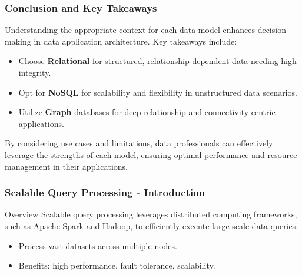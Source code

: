 \documentclass[aspectratio=169]{beamer}
\begin{document}
\begin{frame}[fragile]
    \frametitle{Conclusion and Key Takeaways}
    Understanding the appropriate context for each data model enhances decision-making in data application architecture. Key takeaways include:
    \begin{itemize}
        \item Choose \textbf{Relational} for structured, relationship-dependent data needing high integrity.
        \item Opt for \textbf{NoSQL} for scalability and flexibility in unstructured data scenarios.
        \item Utilize \textbf{Graph} databases for deep relationship and connectivity-centric applications.
    \end{itemize}
    By considering use cases and limitations, data professionals can effectively leverage the strengths of each model, ensuring optimal performance and resource management in their applications.
\end{frame}

\begin{frame}[fragile]
    \frametitle{Scalable Query Processing - Introduction}
    \begin{block}{Overview}
        Scalable query processing leverages distributed computing frameworks, such as Apache Spark and Hadoop, to efficiently execute large-scale data queries.
    \end{block}
    
    \begin{itemize}
        \item Process vast datasets across multiple nodes.
        \item Benefits: high performance, fault tolerance, scalability.
    \end{itemize}
\end{frame}
\end{document}
